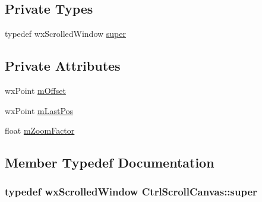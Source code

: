\subsection*{Private Types}
\begin{DoxyCompactItemize}
\item 
typedef wx\-Scrolled\-Window \hyperlink{a00096_a9e3fe6744cb3dbdcb84fd9b595362145}{super}
\end{DoxyCompactItemize}
\subsection*{Private Attributes}
\begin{DoxyCompactItemize}
\item 
wx\-Point \hyperlink{a00096_aa2b08acbe872f9a9d9abf331f61876fa}{m\-Offset}
\item 
wx\-Point \hyperlink{a00096_a2deb0e6b113330f90932aad5f8ec7661}{m\-Last\-Pos}
\item 
float \hyperlink{a00096_a1448ec14be653fb55dc2d74725750362}{m\-Zoom\-Factor}
\end{DoxyCompactItemize}


\subsection{Member Typedef Documentation}
\hypertarget{a00096_a9e3fe6744cb3dbdcb84fd9b595362145}{
\subsubsection[{super}]{\setlength{\rightskip}{0pt plus 5cm}typedef wx\-Scrolled\-Window {\bf Ctrl\-Scroll\-Canvas\-::super}\hspace{0.3cm}{\ttfamily [private]}}}\label{a00096_a9e3fe6744cb3dbdcb84fd9b595362145}


